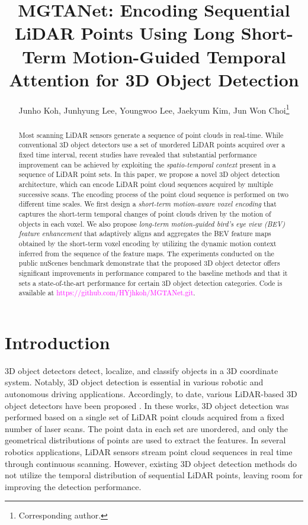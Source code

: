 \documentclass[letterpaper]{article} \usepackage{aaai23}  \usepackage{times}  \usepackage{helvet}  \usepackage{courier}  \usepackage[hyphens]{url}  \usepackage{graphicx} \urlstyle{rm} \def\UrlFont{\rm}  \usepackage{natbib}  \usepackage{caption} \frenchspacing  \setlength{\pdfpagewidth}{8.5in} \usepackage{algorithm}
\title{MGTANet: Encoding Sequential LiDAR Points Using Long Short-Term Motion-Guided Temporal Attention for 3D Object Detection}
\author{
    Junho Koh\equalcontrib,
    Junhyung Lee\equalcontrib,
    Youngwoo Lee,
    Jaekyum Kim,
    Jun Won Choi\thanks{Corresponding author.}
}
\begin{document}
\maketitle

\begin{abstract}
Most scanning LiDAR sensors generate a sequence of point clouds in real-time. While conventional 3D object detectors use a set of unordered LiDAR points acquired over a fixed time interval, recent studies have revealed that substantial performance improvement can be achieved by exploiting the {\it spatio-temporal context} present in a sequence of LiDAR point sets. In this paper, we propose a novel 3D object detection architecture, which can encode LiDAR point cloud sequences acquired by multiple successive scans. The encoding process of the point cloud sequence is performed on two different time scales. We first design a {\it short-term motion-aware voxel encoding} that captures the short-term temporal changes of point clouds driven by the motion of objects in each voxel. We also propose {\it long-term motion-guided bird's eye view (BEV) feature enhancement} that adaptively aligns and aggregates the BEV feature maps obtained by the short-term voxel encoding by utilizing the dynamic motion context inferred from the sequence of the feature maps. The experiments conducted on the public nuScenes benchmark demonstrate that the proposed 3D object detector offers significant improvements in performance compared to the baseline methods and that it sets a state-of-the-art performance for certain 3D object detection categories. Code is available at 
\textcolor{magenta}{https://github.com/HYjhkoh/MGTANet.git}.

\end{abstract}

\section{Introduction}

3D object detectors detect, localize, and classify objects in a 3D coordinate system. Notably, 3D object detection is essential in various robotic and autonomous driving applications. Accordingly, to date, various LiDAR-based 3D object detectors have been proposed \cite{second, pointpillars, voxelnet, voxelrcnn, pointrcnn, 3dssd, pointgnn, fastpointrcnn, STD, pvrcnn, sa-ssd}. In these works, 3D object detection was performed based on a single set of LiDAR point clouds acquired from a fixed number of laser scans. The point data in each set are unordered, and only the geometrical distributions of points are used to extract the features. In several robotics applications, LiDAR sensors stream point cloud sequences in real time through continuous scanning. However, existing 3D object detection methods do not utilize the temporal distribution of sequential LiDAR points, leaving room for improving the detection performance. 
\end{document}
